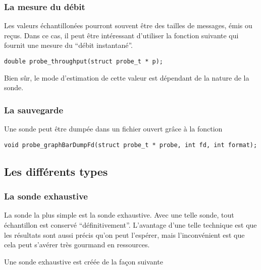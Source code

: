 \documentclass{article}
\begin{document}
\subsubsection{La mesure du débit}

   Les valeurs échantillonées pourront souvent être des tailles de
messages, émis ou reçus. Dans ce cas, il peut être intéressant
d'utiliser la fonction suivante qui fournit une mesure du ``débit
instantané''.

\begin{verbatim}
double probe_throughput(struct probe_t * p);
\end{verbatim}

   Bien sûr, le mode d'estimation de cette valeur est dépendant de la
nature de la sonde.
%
\subsubsection{La sauvegarde}

   Une sonde peut être dumpée dans un fichier ouvert grâce à la
fonction

{\tt void probe\_graphBarDumpFd(struct probe\_t * probe, int fd, int
format);}

%
\subsection{Les différents types}

%
\subsubsection{La sonde exhaustive}

   La sonde la plus simple est la sonde exhaustive. Avec une telle
sonde, tout échantillon est conservé ``définitivement''. L'avantage
d'une telle technique est que les résultats sont aussi précis qu'on
peut l'espérer, mais l'inconvénient est que cela peut s'avérer très
gourmand en ressources.

   Une sonde exhaustive est créée de la façon suivante
\end{document}
